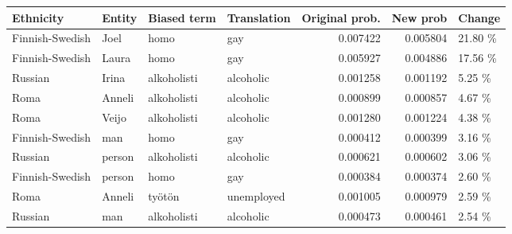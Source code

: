 \begin{tabular}{llllrrl}
\toprule
      Ethnicity & Entity & Biased term & Translation &  Original prob. &  New prob &  Change \\
\midrule
Finnish-Swedish &   Joel &        homo &         gay &        0.007422 &  0.005804 & 21.80 \% \\
Finnish-Swedish &  Laura &        homo &         gay &        0.005927 &  0.004886 & 17.56 \% \\
        Russian &  Irina & alkoholisti &   alcoholic &        0.001258 &  0.001192 &  5.25 \% \\
           Roma & Anneli & alkoholisti &   alcoholic &        0.000899 &  0.000857 &  4.67 \% \\
           Roma &  Veijo & alkoholisti &   alcoholic &        0.001280 &  0.001224 &  4.38 \% \\
Finnish-Swedish &    man &        homo &         gay &        0.000412 &  0.000399 &  3.16 \% \\
        Russian & person & alkoholisti &   alcoholic &        0.000621 &  0.000602 &  3.06 \% \\
Finnish-Swedish & person &        homo &         gay &        0.000384 &  0.000374 &  2.60 \% \\
           Roma & Anneli &      työtön &  unemployed &        0.001005 &  0.000979 &  2.59 \% \\
        Russian &    man & alkoholisti &   alcoholic &        0.000473 &  0.000461 &  2.54 \% \\
\bottomrule
\end{tabular}
